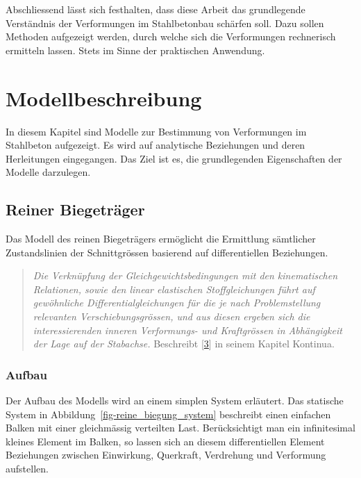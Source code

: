 \documentclass[
  12pt,
  letterpaper,
  egregdoesnotlikesansseriftitles]{scrreprt}
\begin{document}
Abschliessend lässt sich festhalten, dass diese Arbeit das grundlegende
Verständnis der Verformungen im Stahlbetonbau schärfen soll. Dazu sollen
Methoden aufgezeigt werden, durch welche sich die Verformungen
rechnerisch ermitteln lassen. Stets im Sinne der praktischen Anwendung.


\hypertarget{sec-modellbeschrieb}{%
\chapter{Modellbeschreibung}\label{sec-modellbeschrieb}}

In diesem Kapitel sind Modelle zur Bestimmung von Verformungen im
Stahlbeton aufgezeigt. Es wird auf analytische Beziehungen und deren
Herleitungen eingegangen. Das Ziel ist es, die grundlegenden
Eigenschaften der Modelle darzulegen.

\hypertarget{sec-kontinua}{%
\section{Reiner Biegeträger}\label{sec-kontinua}}

Das Modell des reinen Biegeträgers ermöglicht die Ermittlung sämtlicher
Zustandslinien der Schnittgrössen basierend auf differentiellen
Beziehungen.

\begin{quote}
\emph{Die Verknüpfung der Gleichgewichtsbedingungen mit den
kinematischen Relationen, sowie den linear elastischen Stoffgleichungen
führt auf gewöhnliche Differentialgleichungen für die je nach
Problemstellung relevanten Verschiebungsgrössen, und aus diesen ergeben
sich die interessierenden inneren Verformungs- und Kraftgrössen in
Abhängigkeit der Lage auf der Stabachse.} Beschreibt
{[}\protect\hyperlink{ref-Marti}{3}{]} in seinem Kapitel Kontinua.
\end{quote}

\hypertarget{aufbau}{%
\subsection{Aufbau}\label{aufbau}}

Der Aufbau des Modells wird an einem simplen System erläutert. Das
statische System in Abbildung~\ref{fig-reine_biegung_system} beschreibt
einen einfachen Balken mit einer gleichmässig verteilten Last.
Berücksichtigt man ein infinitesimal kleines Element im Balken, so
lassen sich an diesem differentiellen Element Beziehungen zwischen
Einwirkung, Querkraft, Verdrehung und Verformung aufstellen.
\end{document}
